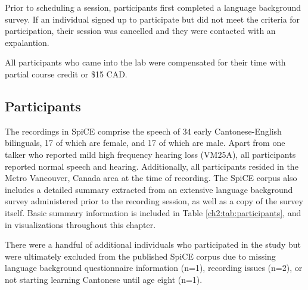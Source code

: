 Prior to scheduling a session, participants first completed a language background survey. If an individual signed up to participate but did not meet the criteria for participation, their session was cancelled and they were contacted with an expalantion.

All participants who came into the lab were compensated for their time with partial course credit or \$15 CAD. 

\subsection{Participants}\label{ch2:subsec:participants} 
The recordings in SpiCE comprise the speech of 34 early Cantonese-English bilinguals, 17 of which are female, and 17 of which are male. Apart from one talker who reported mild high frequency hearing loss (VM25A), all participants reported normal speech and hearing. Additionally, all participants resided in the Metro Vancouver, Canada area at the time of recording. The SpiCE corpus also includes a detailed summary extracted from an extensive language background survey administered prior to the recording session, as well as a copy of the survey itself. Basic summary information is included in Table \ref{ch2:tab:participants}, and in visualizations throughout this chapter. 

There were a handful of additional individuals who participated in the study but were ultimately excluded from the published SpiCE corpus due to missing language background questionnaire information (n=1), recording issues (n=2), or not starting learning Cantonese until age eight (n=1).

